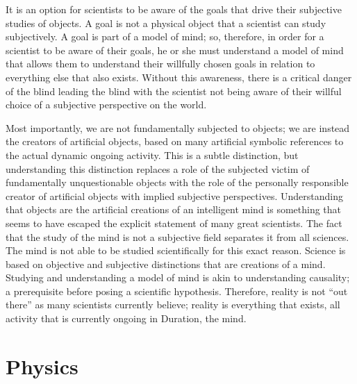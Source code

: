 It is an option for scientists to be aware of the goals that drive
their subjective studies of objects.  A goal is not a physical object
that a scientist can study subjectively.  A goal is part of a model of
mind; so, therefore, in order for a scientist to be aware of their
goals, he or she must understand a model of mind that allows them to
understand their willfully chosen goals in relation to everything else
that also exists.  Without this awareness, there is a critical danger
of the blind leading the blind with the scientist not being aware of
their willful choice of a subjective perspective on the world.

  Most
importantly, we are not fundamentally subjected to objects; we are
instead the creators of artificial objects, based on many artificial
symbolic references to the actual dynamic ongoing activity.  This is a
subtle distinction, but understanding this distinction replaces a role
of the subjected victim of fundamentally unquestionable objects with
the role of the personally responsible creator of artificial objects
with implied subjective perspectives.  Understanding that objects are
the artificial creations of an intelligent mind is something that
seems to have escaped the explicit statement of many great scientists.
The fact that the study of the mind is not a subjective field
separates it from all sciences.  The mind is not able to be studied
scientifically for this exact reason.  Science is based on objective
and subjective distinctions that are creations of a mind.  Studying
and understanding a model of mind is akin to understanding causality;
a prerequisite before posing a scientific hypothesis.  Therefore,
reality is not ``out there'' as many scientists currently believe;
reality is everything that exists, all activity that is currently
ongoing in Duration, the mind.

\section{Physics}

